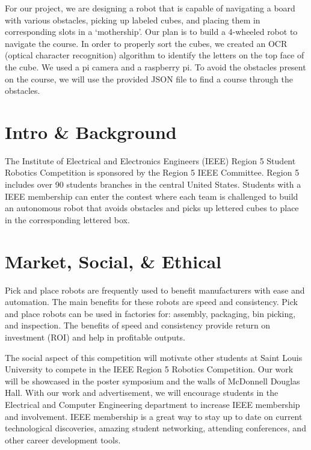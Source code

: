 \documentclass[12pt]{article}
\begin{document}
For our project, we are designing a robot that is capable of navigating a board with various obstacles, picking up labeled cubes, and placing them in corresponding slots in a ‘mothership’. Our plan is to build a 4-wheeled robot to navigate the course. In order to properly sort the cubes, we created an OCR (optical character recognition) algorithm to identify the letters on the top face of the cube. We used a pi camera and a raspberry pi. To avoid the obstacles present on the course, we will use the provided JSON file to find a course through the obstacles.

\section{Intro \& Background} 

The Institute of Electrical and Electronics Engineers (IEEE) Region 5 Student Robotics Competition is sponsored by the Region 5 IEEE Committee. Region 5 includes over 90 students branches in the central United States. \cite{ieeer5} Students with a IEEE membership can enter the contest where each team is challenged to build an autonomous robot that avoids obstacles and picks up lettered cubes to place in the corresponding lettered box. \cite{robcomp}

\section{Market, Social, \& Ethical}

Pick and place robots are frequently used to benefit manufacturers with ease and automation. The main benefits for these robots are speed and consistency. Pick and place robots can be used in factories for: assembly, packaging, bin picking, and inspection. The benefits of speed and consistency provide return on investment (ROI) and help in profitable outputs. \cite{pickandplace}

The social aspect of this competition will motivate other students at Saint Louis University to compete in the IEEE Region 5 Robotics Competition. Our work will be showcased in the poster symposium and the walls of McDonnell Douglas Hall. With our work and advertisement, we will encourage students in the Electrical and Computer Engineering department to increase IEEE membership and involvement. IEEE membership is a great way to stay up to date on current technological discoveries, amazing student networking, attending conferences, and other career development tools. \cite{memval}
\end{document}

